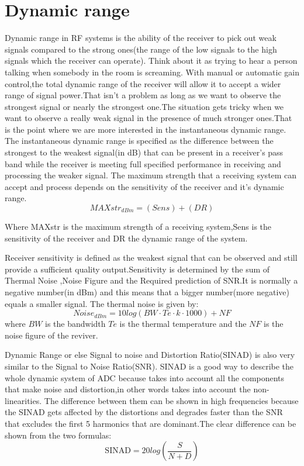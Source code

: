 \section{Dynamic range}
Dynamic range in RF systems is the ability of the receiver to pick out weak signals compared to the strong ones(the range of the low signals to the high signals which the receiver can operate). Think about it as trying to hear a person talking when somebody in the room is screaming.  
With manual or automatic gain control,the total dynamic range of the receiver will allow it to accept a wider range of signal power.That isn't a problem as long as we want to observe the strongest signal or nearly the strongest one.The situation gets tricky when we want to observe a really weak signal in the presence of much stronger ones.That is the point where we are more interested in the instantaneous dynamic range.
The instantaneous dynamic range is specified as the difference between the strongest to the weakest signal(in dB) that can be present in a receiver's pass band while the receiver is meeting full specified performance in receiving and processing the weaker signal.
The maximum strength that a receiving system can accept and process depends on the sensitivity of the receiver and it's dynamic range.
\begin{equation}
MAXstr_{dBm} = (Sens) +(DR)
\label{Max strength of a receiving system}
\end{equation}

Where MAXstr is the maximum strength of a receiving system,Sens is the sensitivity of the receiver and DR the dynamic range of the system.\citep{DyR}

Receiver sensitivity is defined as the weakest signal that can be observed and still provide a sufficient quality output.Sensitivity is determined by the sum of Thermal Noise ,Noise Figure and the Required prediction of SNR.It is normally a negative number(in dBm) and this means that a bigger number(more negative) equals a smaller signal.
The thermal noise is given by:
\begin{equation}
Noise_{dBm} = 10log(BW\cdot Te\cdot k\cdot 1000) + NF
\label{Noise1}
\end{equation}
where $BW$ is the bandwidth $Te$ is the thermal temperature and the $NF$ is the noise figure of the reviver.

Dynamic Range or else Signal to noise and Distortion Ratio(SINAD) is also very similar to the Signal to Noise Ratio(SNR). SINAD is a good way to describe the whole dynamic system of ADC because takes into account all the components that make noise and distortion,in other words takes into account the non-linearities. The difference between them can be shown in high frequencies because the SINAD gets affected by the distortions and degrades faster than the SNR that excludes the first 5 harmonics that are dominant.The clear difference can be shown from the two formulas:
\begin{equation}
\text{SINAD} = 20log\left(\frac{S}{N+D}\right)
\end{equation}

